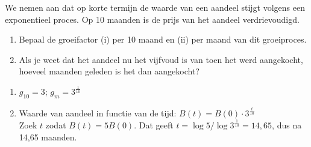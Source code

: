 \begin{oef}
 We nemen aan dat op korte termijn de waarde van een aandeel stijgt
      volgens een exponentieel  proces. Op 10 maanden is de prijs van
      het aandeel verdrievoudigd.
      \begin{enumerate}
          \item    Bepaal de groeifactor (i) per 10 maand en (ii) per maand van dit groeiproces.
          
	 \item  Als je weet dat het aandeel nu het vijfvoud is van
          toen het werd aangekocht, hoeveel maanden geleden is het dan
          aangekocht?
      \end{enumerate}
      \begin{opl}
      \begin{enumerate}
      \item $g_{10}=3$; $g_m=3^\frac{1}{10}$
      \item Waarde van aandeel in functie van de tijd: $B(t)=B(0)\cdot 3^\frac{t}{10}$ \\
      Zoek $t$ zodat $B(t)=5B(0)$. Dat geeft $t=\log5/\log3^\frac{1}{10}=14,65$, dus na 14,65 maanden.
      \end{enumerate}
      \end{opl}
       \end{oef}


